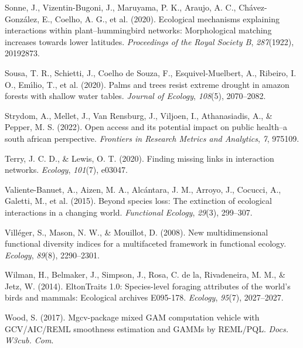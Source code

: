 \documentclass[
]{agujournal2019}
\newlength{\cslhangindent}
\newenvironment{CSLReferences}[2] %
 {\begin{list}{}{%
  \setlength{\itemindent}{0pt}
  \setlength{\leftmargin}{0pt}
  \setlength{\parsep}{0pt}
  \ifodd #1
   \setlength{\leftmargin}{\cslhangindent}
   \setlength{\itemindent}{-1\cslhangindent}
  \fi
  \setlength{\itemsep}{#2\baselineskip}}}
 {\end{list}}
\begin{document}
\begin{CSLReferences}{1}{0}
Sonne, J., Vizentin-Bugoni, J., Maruyama, P. K., Araujo, A. C.,
Chávez-González, E., Coelho, A. G., et al. (2020). Ecological mechanisms
explaining interactions within plant--hummingbird networks:
Morphological matching increases towards lower latitudes.
\emph{Proceedings of the Royal Society B}, \emph{287}(1922), 20192873.

Sousa, T. R., Schietti, J., Coelho de Souza, F., Esquivel-Muelbert, A.,
Ribeiro, I. O., Emı́lio, T., et al. (2020). Palms and trees resist
extreme drought in amazon forests with shallow water tables.
\emph{Journal of Ecology}, \emph{108}(5), 2070--2082.

Strydom, A., Mellet, J., Van Rensburg, J., Viljoen, I., Athanasiadis,
A., \& Pepper, M. S. (2022). Open access and its potential impact on
public health--a south african perspective. \emph{Frontiers in Research
Metrics and Analytics}, \emph{7}, 975109.

Terry, J. C. D., \& Lewis, O. T. (2020). Finding missing links in
interaction networks. \emph{Ecology}, \emph{101}(7), e03047.

Valiente-Banuet, A., Aizen, M. A., Alcántara, J. M., Arroyo, J.,
Cocucci, A., Galetti, M., et al. (2015). Beyond species loss: The
extinction of ecological interactions in a changing world.
\emph{Functional Ecology}, \emph{29}(3), 299--307.

Villéger, S., Mason, N. W., \& Mouillot, D. (2008). New multidimensional
functional diversity indices for a multifaceted framework in functional
ecology. \emph{Ecology}, \emph{89}(8), 2290--2301.

Wilman, H., Belmaker, J., Simpson, J., Rosa, C. de la, Rivadeneira, M.
M., \& Jetz, W. (2014). EltonTraits 1.0: Species-level foraging
attributes of the world's birds and mammals: Ecological archives
E095-178. \emph{Ecology}, \emph{95}(7), 2027--2027.

Wood, S. (2017). Mgcv-package mixed GAM computation vehicle with
GCV/AIC/REML smoothness estimation and GAMMs by REML/PQL. \emph{Docs.
W3cub. Com}.

\end{CSLReferences}
\end{document}
